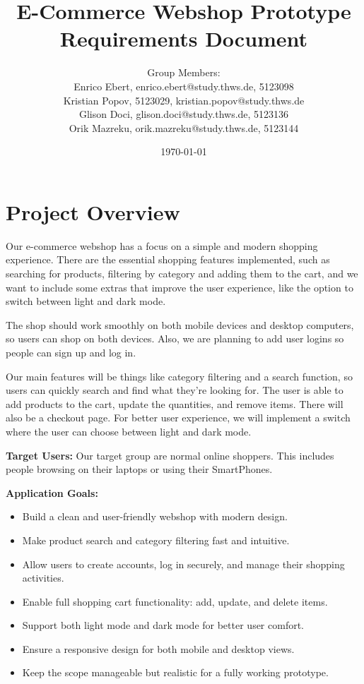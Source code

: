 \documentclass[a4paper,12pt]{article.cls}
\title{E-Commerce Webshop Prototype \\
	Requirements Document}
\author{
	Group Members: \\
	Enrico Ebert, enrico.ebert@study.thws.de, 5123098 \\
	Kristian Popov, 5123029, kristian.popov@study.thws.de \\
	Glison Doci, glison.doci@study.thws.de, 5123136 \\
	Orik Mazreku, orik.mazreku@study.thws.de, 5123144
}
\date{\today}
\begin{document}
	
	\maketitle
	
\section{Project Overview}

Our e-commerce webshop has a focus on a simple and modern shopping experience. There are the essential shopping features implemented, such as searching for products, filtering by category and adding them to the cart, and we want to include some extras that improve the user experience, like the option to switch between light and dark mode.

The shop should work smoothly on both mobile devices and desktop computers, so users can shop on both devices. Also, we are planning to add user logins so people can sign up and log in.

Our main features will be things like category filtering and a search function, so users can quickly search and find what they’re looking for. The user is able to add products to the cart, update the quantities, and remove items. There will also be a checkout page. For better user experience, we will implement a switch where the user can choose between light and dark mode.

\textbf{Target Users: }  
Our target group are normal online shoppers. This includes people browsing on their laptops or using their SmartPhones.

\textbf{Application Goals:}
\begin{itemize}
	\item Build a clean and user-friendly webshop with modern design.
	\item Make product search and category filtering fast and intuitive.
	\item Allow users to create accounts, log in securely, and manage their shopping activities.
	\item Enable full shopping cart functionality: add, update, and delete items.
	\item Support both light mode and dark mode for better user comfort.
	\item Ensure a responsive design for both mobile and desktop views.
	\item Keep the scope manageable but realistic for a fully working prototype.
\end{itemize}
	
\end{document}
